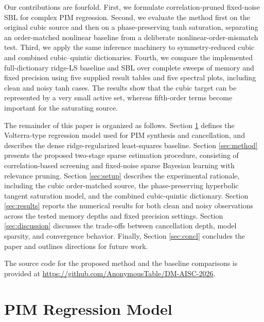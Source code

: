 \documentclass[conference]{IEEEtran}
\begin{document}
Our contributions are fourfold. First, we formulate correlation-pruned fixed-noise SBL for complex PIM regression. Second, we evaluate the method first on the original cubic source and then on a phase-preserving tanh saturation, separating an order-matched nonlinear baseline from a deliberate nonlinear-order-mismatch test. Third, we apply the same inference machinery to symmetry-reduced cubic and combined cubic--quintic dictionaries. Fourth, we compare the implemented full-dictionary ridge-LS baseline and SBL over complete sweeps of memory and fixed precision using five supplied result tables and five spectral plots, including clean and noisy tanh cases. The results show that the cubic target can be represented by a very small active set, whereas fifth-order terms become important for the saturating source.

The remainder of this paper is organized as follows. Section \ref{sec:model} defines the Volterra-type regression model used for PIM synthesis and cancellation, and describes the dense ridge-regularized least-squares baseline. Section \ref{sec:method} presents the proposed two-stage sparse estimation procedure, consisting of correlation-based screening and fixed-noise sparse Bayesian learning with relevance pruning. Section \ref{sec:setup} describes the experimental rationale, including the cubic order-matched source, the phase-preserving hyperbolic tangent saturation model, and the combined cubic-quintic dictionary. Section \ref{sec:results} reports the numerical results for both clean and noisy observations across the tested memory depths and fixed precision settings. Section \ref{sec:discussion} discusses the trade-offs between cancellation depth, model sparsity, and convergence behavior. Finally, Section \ref{sec:concl} concludes the paper and outlines directions for future work.

The source code for the proposed method and the baseline comparisons is provided at \url{https://github.com/AnonymousTable/DM-AISC-2026}.
\section{PIM Regression Model}
\label{sec:model}
\end{document}
